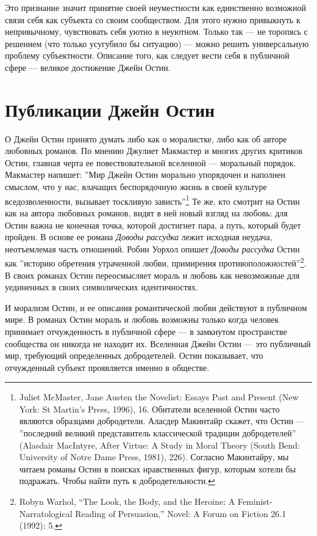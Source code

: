 \documentclass[12pt]{book}
\begin{document}
Это признание значит принятие своей неуместности как единственно возможной связи себя как субъекта со своим сообществом. Для этого нужно привыкнуть к непривычному, чувствовать себя уютно в неуютном. Только так --- не торопясь с решением (что только усугубило бы ситуацию) --- можно решить универсальную проблему субъектности. Описание того, как следует вести себя в публичной сфере --- великое достижение Джейн Остин.

\section{Публикации Джейн Остин}

О Джейн Остин принято думать либо как о моралистке, либо как об авторе любовных романов. По мнению Джулиет Макмастер и многих других критиков Остин, главная черта ее повествовательной вселенной --- моральный порядок. Макмастер напишет: ''Мир Джейн Остин морально упорядочен и наполнен смыслом, что у нас, влачащих беспорядочную жизнь в своей культуре вседозволенности, вызывает тоскливую зависть''\footnote{Juliet McMaster, Jane Austen the Novelist: Essays Past and Present (New York: St Martin’s Press, 1996), 16. Обитатели вселенной Остин часто являются образцами добродетели. Аласдер Макинтайр скажет, что Остин --- ''последний великий представитель классической традиции добродетелей'' (Alasdair MacIntyre, After Virtue: A Study in Moral Theory (South Bend: University of Notre Dame Press, 1981), 226). Согласно Макинтайру, мы читаем романы Остин в поисках нравственных фигур, которым хотели бы подражать. Чтобы найти путь к добродетельности.} Те же, кто смотрит на Остин как на автора любовных романов, видят в ней новый взгляд на любовь: для Остин важна не конечная точка, которой достигнет пара, а путь, который будет пройден. В основе ее романа \textit{Доводы рассудка} лежит исходная неудача, неотъемлемая часть отношений. Робин Уорхол опишет \textit{Доводы рассудка} Остин как ''историю обретения утраченной любви, примирения противоположностей''\footnote{Robyn Warhol, “The Look, the Body, and the Heroine: A Feminist-Narratological Reading of Persuasion,” Novel: A Forum on Fiction 26.1 (1992): 5.}. В своих романах Остин переосмысляет мораль и любовь как невозможные для уединенных в своих символических идентичностях.

И морализм Остин, и ее описания романтической любви действуют в публичном мире. В романах Остин мораль и любовь возможны только когда человек принимает отчужденность в публичной сфере --- в замкнутом пространстве сообщества он никогда не находит их. Вселенная Джейн Остин --- это публичный мир, требующий определенных добродетелей. Остин показывает, что отчужденный субъект проявляется именно в обществе.
\end{document}
